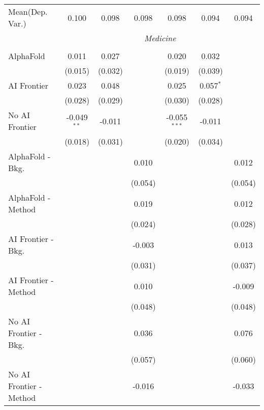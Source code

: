 \begin{tabular}{lcccccc}
Mean(Dep. Var.) & 0.100 & 0.098 & 0.098 & 0.098 & 0.094 & 0.094 \\
 & \multicolumn{6}{c}{\textit{Medicine}} \\ \\
   AlphaFold               & 0.011         & 0.027   &         & 0.020          & 0.032       &   \\   
                           & (0.015)       & (0.032) &         & (0.019)        & (0.039)     &   \\   
   AI Frontier             & 0.023         & 0.048   &         & 0.025          & 0.057$^{*}$ &   \\   
                           & (0.028)       & (0.029) &         & (0.030)        & (0.028)     &   \\   
   No AI Frontier          & -0.049$^{**}$ & -0.011  &         & -0.055$^{***}$ & -0.011      &   \\   
                           & (0.018)       & (0.031) &         & (0.020)        & (0.034)     &   \\   
   AlphaFold - Bkg.        &               &         & 0.010   &                &             & 0.012\\   
                           &               &         & (0.054) &                &             & (0.054)\\   
   AlphaFold - Method      &               &         & 0.019   &                &             & 0.012\\   
                           &               &         & (0.024) &                &             & (0.028)\\   
   AI Frontier - Bkg.      &               &         & -0.003  &                &             & 0.013\\   
                           &               &         & (0.031) &                &             & (0.037)\\   
   AI Frontier - Method    &               &         & 0.010   &                &             & -0.009\\   
                           &               &         & (0.048) &                &             & (0.048)\\   
   No AI Frontier - Bkg.   &               &         & 0.036   &                &             & 0.076\\   
                           &               &         & (0.057) &                &             & (0.060)\\   
   No AI Frontier - Method &               &         & -0.016  &                &             & -0.033\\   

\end{tabular}
